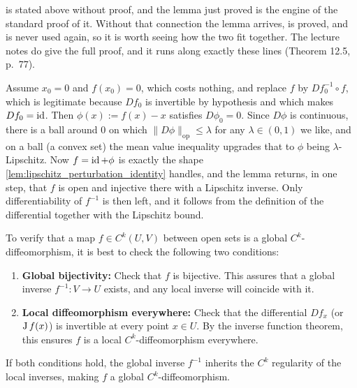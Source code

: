 %
\begin{ainote}
 is stated above without proof, and the lemma just proved is
the engine of the standard proof of it. Without that connection the lemma arrives, is proved,
and is never used again, so it is worth seeing how the two fit together. The lecture notes do
give the full proof, and it runs along exactly these lines (Theorem 12.5, p.\ 77).

Assume $x_0 = 0$ and $f(x_0) = 0$, which costs nothing, and replace $f$ by $Df_0^{-1}\circ f$,
which is legitimate because $Df_0$ is invertible by hypothesis and which makes $Df_0 = \operatorname{id}$.
Then $\phi(x) := f(x) - x$ satisfies $D\phi_0 = 0$. Since $D\phi$ is continuous, there is a ball
around $0$ on which $\|D\phi\|_{\mathrm{op}} \leq \lambda$ for any $\lambda \in (0,1)$ we like, and on a ball
(a convex set) the mean value inequality upgrades that to $\phi$ being $\lambda$-Lipschitz. Now
$f = \operatorname{id} + \phi$ is exactly the shape \cref{lem:lipschitz_perturbation_identity} handles, and the
lemma returns, in one step, that $f$ is open and injective there with a Lipschitz inverse. Only
differentiability of $f^{-1}$ is then left, and it follows from the definition of the
differential together with the Lipschitz bound.
\end{ainote}

\begin{remark}
\label{rem:global_diffeomorphism_check}
To verify that a map $f \in C^k(U, V)$ between open sets is a global $C^k$-diffeomorphism, it is best to check the following two conditions:
\begin{enumerate}[label=\textbf{(\alph*)}]
  \item \textbf{Global bijectivity:} Check that $f$ is bijective. This assures that a global inverse $f^{-1} : V \to U$ exists, and any local inverse will coincide with it.
  \item \textbf{Local diffeomorphism everywhere:} Check that the differential $Df_x$ (or $\operatorname{J} f(x)$) is invertible at every point $x \in U$. By the inverse function theorem, this ensures $f$ is a local $C^k$-diffeomorphism everywhere.
\end{enumerate}
If both conditions hold, the global inverse $f^{-1}$ inherits the $C^k$ regularity of the local inverses, making $f$ a global $C^k$-diffeomorphism.
\end{remark}

